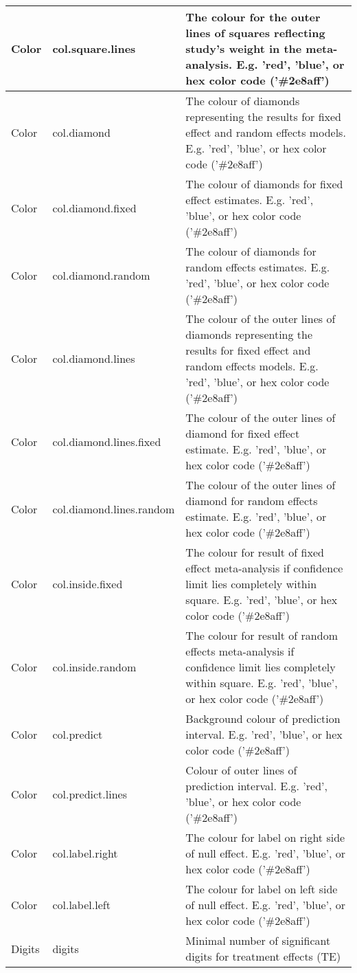 \documentclass[]{book}
\theoremstyle{definition}
\theoremstyle{definition}
\theoremstyle{definition}
\theoremstyle{remark}
\begin{document}
\begin{tabular}{l|l|l}
\hline
Color & col.square.lines & The colour for the outer lines of squares reflecting study's weight in the meta-analysis. E.g. 'red', 'blue', or hex color code ('\#2e8aff')\\
\hline
Color & col.diamond & The colour of diamonds representing the results for fixed effect and random effects models. E.g. 'red', 'blue', or hex color code ('\#2e8aff')\\
\hline
Color & col.diamond.fixed & The colour of diamonds for fixed effect estimates. E.g. 'red', 'blue', or hex color code ('\#2e8aff')\\
\hline
Color & col.diamond.random & The colour of diamonds for random effects estimates. E.g. 'red', 'blue', or hex color code ('\#2e8aff')\\
\hline
Color & col.diamond.lines & The colour of the outer lines of diamonds representing the results for fixed effect and random effects models. E.g. 'red', 'blue', or hex color code ('\#2e8aff')\\
\hline
Color & col.diamond.lines.fixed & The colour of the outer lines of diamond for fixed effect estimate. E.g. 'red', 'blue', or hex color code ('\#2e8aff')\\
\hline
Color & col.diamond.lines.random & The colour of the outer lines of diamond for random effects estimate. E.g. 'red', 'blue', or hex color code ('\#2e8aff')\\
\hline
Color & col.inside.fixed & The colour for result of fixed effect meta-analysis if confidence limit lies completely within square. E.g. 'red', 'blue', or hex color code ('\#2e8aff')\\
\hline
Color & col.inside.random & The colour for result of random effects meta-analysis if confidence limit lies completely within square. E.g. 'red', 'blue', or hex color code ('\#2e8aff')\\
\hline
Color & col.predict & Background colour of prediction interval. E.g. 'red', 'blue', or hex color code ('\#2e8aff')\\
\hline
Color & col.predict.lines & Colour of outer lines of prediction interval. E.g. 'red', 'blue', or hex color code ('\#2e8aff')\\
\hline
Color & col.label.right & The colour for label on right side of null effect. E.g. 'red', 'blue', or hex color code ('\#2e8aff')\\
\hline
Color & col.label.left & The colour for label on left side of null effect. E.g. 'red', 'blue', or hex color code ('\#2e8aff')\\
\hline
Digits & digits & Minimal number of significant digits for treatment effects (TE)\\

\end{tabular}
\end{document}
